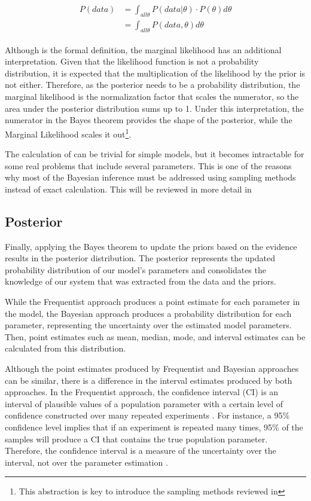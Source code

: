 \begin{align}\label{eq:marginal_likelihood}
\begin{split}
    P(data)&=\int_{all \theta} P(data|\theta)\cdot P(\theta)d\theta  \\ 
    &=\int_{all \theta} P(data, \theta)d\theta
\end{split}
\end{align}

Although  is the formal definition, the marginal likelihood has an additional interpretation. Given that the likelihood function is not a probability distribution, it is expected that the multiplication of the likelihood by the prior is not either. Therefore, as the posterior needs to be a probability distribution, the marginal likelihood is the normalization factor that scales the numerator, so the area under the posterior distribution sums up to 1. Under this interpretation, the numerator in the Bayes theorem provides the shape of the posterior, while the Marginal Likelihood scales it out\footnote{This abstraction is key to introduce the sampling methods reviewed in }. 

The calculation of  can be trivial for simple models, but it becomes intractable for some real problems that include several parameters. This is one of the reasons why most of the Bayesian inference must be addressed using sampling methods instead of exact calculation. This will be reviewed in more detail in 

\subsection{Posterior} 

Finally, applying the Bayes theorem to update the priors based on the evidence results in the posterior distribution. The posterior represents the updated probability distribution of our model's parameters and consolidates the knowledge of our system that was extracted from the data and the priors. 

While the Frequentist approach produces a point estimate for each parameter in the model, the Bayesian approach produces a probability distribution for each parameter, representing the uncertainty over the estimated model parameters. Then, point estimates such as mean, median, mode, and interval estimates can be calculated from this distribution. 

Although the point estimates produced by Frequentist and Bayesian approaches can be similar, there is a difference in the interval estimates produced by both approaches. In the Frequentist approach, the confidence interval (CI) is an interval of plausible values of a population parameter with a certain level of confidence constructed over many repeated experiments \citep{Devore2016}. For instance, a 95\% confidence level implies that if an experiment is repeated many times, 95\% of the samples will produce a CI that contains the true population parameter. Therefore, the confidence interval is a measure of the uncertainty over the interval, not over the parameter estimation \citep{Lambert2018}. 

